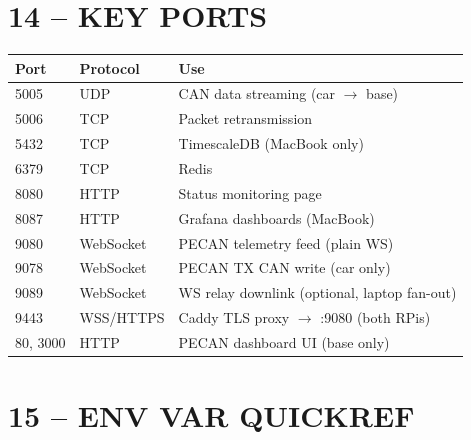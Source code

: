\documentclass[a5paper,10pt]{article}
\begin{document}
\section*{14 -- KEY PORTS}

\noindent
\begin{tabularx}{\linewidth}{p{14mm}p{22mm}X}
  \toprule
  \textbf{Port} & \textbf{Protocol} & \textbf{Use} \\
  \midrule
  5005 & UDP & CAN data streaming (car $\rightarrow$ base) \\
  5006 & TCP & Packet retransmission \\
  5432 & TCP & TimescaleDB (MacBook only) \\
  6379 & TCP & Redis \\
  8080 & HTTP & Status monitoring page \\
  8087 & HTTP & Grafana dashboards (MacBook) \\
  9080 & WebSocket & PECAN telemetry feed (plain WS) \\
  9078 & WebSocket & PECAN TX CAN write (car only) \\
  9089 & WebSocket & WS relay downlink (optional, laptop fan-out) \\
  9443 & WSS/HTTPS & Caddy TLS proxy $\rightarrow$ :9080 (both RPis) \\
  80, 3000 & HTTP & PECAN dashboard UI (base only) \\
  \bottomrule
\end{tabularx}
\vspace{2mm}

\section*{15 -- ENV VAR QUICKREF}
\end{document}
